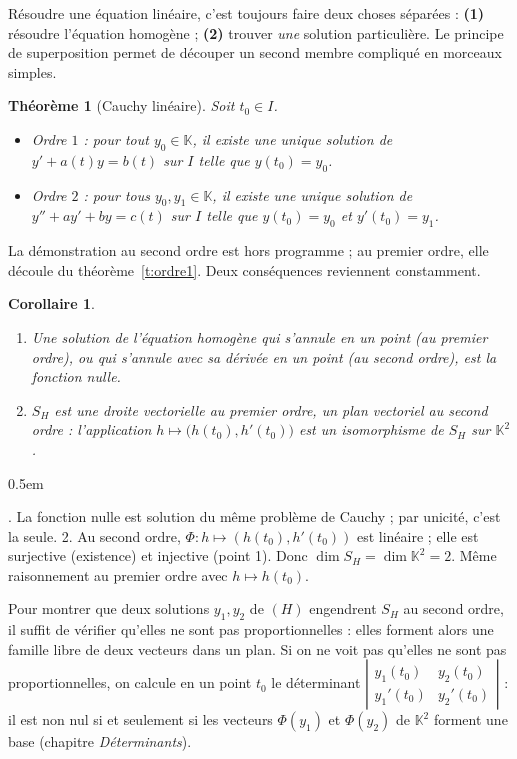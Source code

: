 \documentclass[a4paper,11pt]{article}
\makeatletter
\numberwithin{equation}{section}
\numberwithin{figure}{section}
\numberwithin{table}{section}
\theoremstyle{enonce}
\newtheorem{theoreme}[definition]{Théorème}
\newtheorem{corollaire}[definition]{Corollaire}
\theoremstyle{exemple}
\theoremstyle{remarque}
\renewcommand{\proofname}{Démonstration}
\renewenvironment{proof}[1][\proofname]{\par\pushQED{\qed}\normalfont
  \topsep0.5em\relax\trivlist\item[\hskip\labelsep\sffamily\itshape\color{Gris}#1.]\ignorespaces}
  {\popQED\endtrivlist\@endpefalse}
\newcommand{\K}{\mathbb{K}}
\newcommand{\dt}[1]{\left|\begin{matrix}#1\end{matrix}\right|}
\newif\ifPT \ifdefined\VERSIONPT \PTtrue \else \PTfalse \fi
\makeatother
\begin{document}
\begin{reflexe}
Résoudre une équation linéaire, c'est toujours faire deux choses séparées : \textbf{(1)} résoudre l'équation homogène ;
\textbf{(2)} trouver \emph{une} solution particulière. Le principe de superposition permet de découper un second membre compliqué
en morceaux simples.
\end{reflexe}

\begin{theoreme}[Cauchy linéaire]\label{t:cauchy}
Soit $t_0\in I$.
\begin{itemize}
\item Ordre $1$ : pour tout $y_0\in\K$, il existe une unique solution de $y'+a(t)y=b(t)$ sur $I$ telle que $y(t_0)=y_0$.
\item Ordre $2$ : pour tous $y_0,y_1\in\K$, il existe une unique solution de \ifPT$y''+a(t)y'+b(t)y=c(t)$\else$y''+ay'+by=c(t)$\fi{} sur $I$ telle que
$y(t_0)=y_0$ et $y'(t_0)=y_1$.
\end{itemize}
\end{theoreme}

La démonstration au second ordre est hors programme ; au premier ordre, elle découle du théorème~\ref{t:ordre1}. Deux
conséquences reviennent constamment.

\begin{corollaire}\label{c:dim}
\begin{enumerate}
\item Une solution de l'équation homogène qui s'annule en un point (au premier ordre), ou qui s'annule avec sa dérivée en un
point (au second ordre), est la fonction nulle.
\item $S_H$ est une droite vectorielle au premier ordre, un plan vectoriel au second ordre : l'application
$h\mapsto\big(h(t_0),h'(t_0)\big)$ est un isomorphisme de $S_H$ sur $\K^2$.
\end{enumerate}
\end{corollaire}

\begin{proof}
1. La fonction nulle est solution du même problème de Cauchy ; par unicité, c'est la seule.
2. Au second ordre, $\Phi:h\mapsto(h(t_0),h'(t_0))$ est linéaire ; elle est surjective (existence) et injective (point 1). Donc
$\dim S_H=\dim\K^2=2$. Même raisonnement au premier ordre avec $h\mapsto h(t_0)$.
\end{proof}

\begin{enpratique}
Pour montrer que deux solutions $y_1,y_2$ de $(H)$ engendrent $S_H$ au second ordre, il suffit de vérifier qu'elles ne sont pas
proportionnelles : elles forment alors une famille libre de deux vecteurs dans un plan. Si on ne voit pas qu'elles ne sont pas
proportionnelles, on calcule en un point $t_0$ le déterminant $\dt{y_1(t_0)&y_2(t_0)\\y_1'(t_0)&y_2'(t_0)}$ : il est non nul
si et seulement si les vecteurs $\Phi(y_1)$ et $\Phi(y_2)$ de $\K^2$ forment une base (chapitre \emph{Déterminants}).
\end{enpratique}
\end{document}
